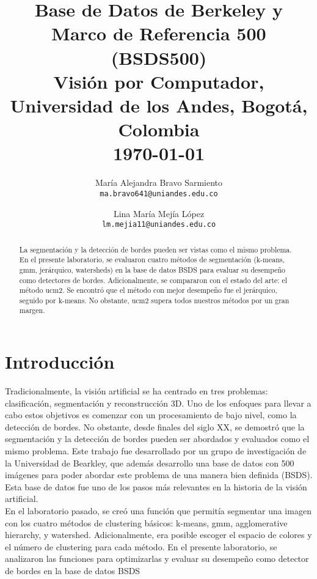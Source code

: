\documentclass[10pt,twocolumn,letterpaper]{article}
\begin{document}
\title{Base de Datos de Berkeley y Marco de Referencia 500 (BSDS500)\\
{\small Visión por Computador, Universidad de los Andes, Bogotá, Colombia\\
\today} 
}

\author{María Alejandra Bravo Sarmiento\\
{\tt\small ma.bravo641@uniandes.edu.co}
\and
Lina María Mejía López\\
{\tt\small lm.mejia11@uniandes.edu.co}
}

\maketitle

\begin{abstract}
La segmentación y la detección de bordes pueden ser vistas como el mismo problema. En el presente laboratorio, se evaluaron cuatro métodos de segmentación (k-means, gmm, jerárquico, watersheds) en la base de datos BSDS para evaluar su desempeño como detectores de bordes. Adicionalmente, se compararon con el estado del arte: el método ucm2. Se encontró que el método con mejor desempeño fue el jerárquico, seguido por k-means. No obstante, ucm2 supera todos nuestros métodos por un gran margen.
\end{abstract}

\section{Introducción}
Tradicionalmente, la visión artificial se ha centrado en tres problemas: clasificación, segmentación y reconstrucción 3D. Uno de los enfoques para llevar a cabo estos objetivos es comenzar con un procesamiento de bajo nivel, como la detección de bordes. No obstante, desde finales del siglo XX, se demostró que la segmentación y la detección de bordes pueden ser abordados y evaluados como el mismo problema. Este trabajo fue desarrollado por un grupo de investigación de la Universidad de Bearkley, que además desarrollo una base de datos con 500 imágenes para poder abordar este problema de una manera bien definida (BSDS). Esta base de datos fue uno de los pasos más relevantes en la historia de la visión artificial.
\\
En el laboratorio pasado, se creó una función que permitía segmentar una imagen con los cuatro métodos de clustering básicos: k-means, gmm, agglomerative hierarchy, y watershed. Adicionalmente, era posible escoger el espacio de colores y el número de clustering para cada método. En el presente laboratorio, se analizaron las funciones para optimizarlas y evaluar su desempeño como detector de bordes en la base de datos BSDS
\end{document}
